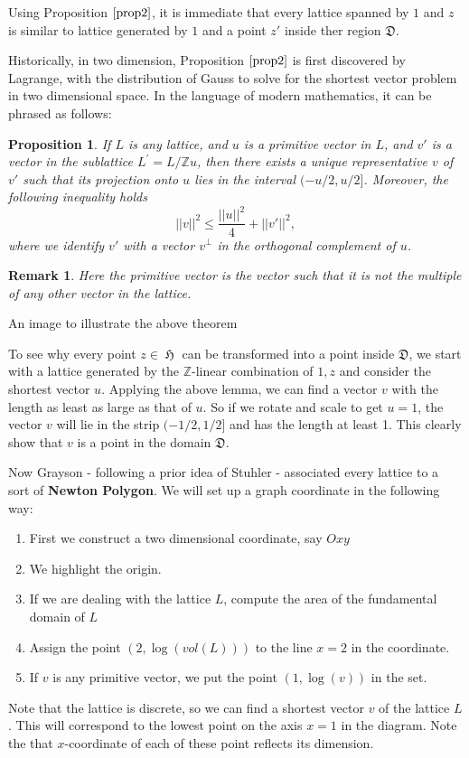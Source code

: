 \documentclass[12pt]{article} %
\newtheorem{prop}{Proposition}[section]
\newtheorem*{remark}{Remark}
\DeclareMathOperator{\uH}{\mathfrak{H}}
\begin{document}
Using Proposition $\ref{prop2}$, it is immediate that every lattice spanned by $1$ and $z$
is similar to lattice generated by $1$ and a point $z'$ inside ther region $\mathfrak{D}$.

Historically, in two dimension, Proposition $\ref{prop2}$ is first discovered by Lagrange, with the distribution
of Gauss to solve for the shortest vector problem in two dimensional space. In the language of modern mathematics,
it can be phrased as follows:
\begin{prop}
  If $L$ is any lattice, and $u$ is a primitive vector in $L$, and $v'$ is a vector in the sublattice
  $L^\prime = L/\mathbb{Z}u$, then there exists a unique representative $v$ of $v'$ such that its projection onto $u$ lies in the interval
  $(-u/2,u/2]$. Moreover, the following inequality holds
  \[||v||^2 \le \dfrac{||u||^2}{4}+||v'||^2,\]
  where we identify $v'$ with a vector $v^\perp$ in the orthogonal complement of $u$.
\end{prop}
\begin{remark}
  Here the primitive vector is the vector such that it is not the multiple of any other vector in the lattice.
\end{remark}
An image to illustrate the above theorem 

To see why every point $z \in \uH$ can be transformed into a point inside $\mathfrak{D}$,
we start with a lattice generated by the $\mathbb{Z}$-linear combination of $1,z$ and
consider the shortest vector $u$. Applying the above lemma, we can find a vector $v$ with the length as least
as large as that of $u$. So if we rotate and scale to get $u=1$, the vector $v$ will lie
in the strip $(-1/2,1/2]$ and has the length at least 1. This clearly show that $v$ is a point in the domain
$\mathfrak{D}$.


\vspace{\baselineskip}
Now Grayson - following a prior idea of Stuhler - associated every lattice to a sort of \textbf{Newton Polygon}.
We will set up a graph coordinate in the following way:
\begin{enumerate}
  \item First we construct a two dimensional coordinate, say $Oxy$
  \item We highlight the origin.
  \item If we are dealing with the lattice $L$, compute the area of the fundamental domain of $L$
  \item Assign the point $(2, \log(vol(L)))$ to the line $x=2$ in the coordinate.
  \item If $v$ is any primitive vector, we put the point $(1,\log(v))$ in the set.
\end{enumerate}
Note that the lattice is discrete, so we can find a shortest vector $v$ of the lattice $L$. This will
correspond to the lowest point on the axis $x=1$ in the diagram. Note the that $x$-coordinate
of each of these point reflects its dimension.
\end{document}
